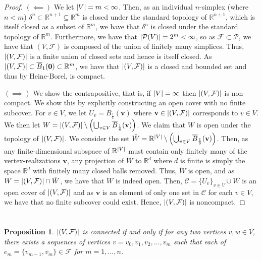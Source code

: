 \documentclass[english]{article}
\renewcommand\vec{\mathbf}
\DeclarePairedDelimiter\abs{\lvert}{\rvert}%
\newcommand{\RR}{\mathbb{R}}
\newcommand{\prob}[1]{\setcounter{section}{#1-1}\section{}}
\newtheorem*{proposition*}{Proposition}
\theoremstyle{remark}
\theoremstyle{definition}
\newcommand{\PP}{\mathcal{P}}
\newcommand{\Fcal}{\mathcal{F}}
\newcommand{\cbal}{\overline{B}}
\newcommand{\Ccal}{\mathcal{C}}
\begin{document}
\begin{proof}
	$(\impliedby)$ We let $\abs{V}=m<\infty$. Then, as an individual $n$-simplex (where $n<m$) $\delta^n\subset \RR^{n+1}\subseteq \RR^m$ is closed under the standard topology of $\RR^{n+1}$, which is itself closed as a subset of $\RR^{m}$, we have that $\delta^n$ is closed under the standard topology of $\RR^{m}$. 
	Furthermore, we have that $\abs{\PP(V)}=2^{m}<\infty$, so as $\Fcal\subset \PP$, we have that $(V,\Fcal)$ is composed of the union of finitely many simplices. 
	Thus, $\abs{(V,\Fcal)}$ is a finite union of closed sets and hence is itself closed. 
	As $\abs{(V,\Fcal)}\subset \overline{B}_{1}(\vec{0})\subset \RR^m$, we have that $\abs{(V,\Fcal)}$ is a closed and bounded set and thus by Heine-Borel, is compact.
	
	$(\implies)$ We show the contrapositive, that is, if $\abs{V}=\infty$ then $\abs{(V,\Fcal)}$ is non-compact.
	 We show this by explicitly constructing an open cover with no finite subcover. For $v\in V$, we let $U_v=B_{\frac{1}{4}}(\vec{v})$ where $\vec{v}\in \abs{(V,\Fcal)}$ corresponds to $v\in V$. We then let $W=\abs{(V,\Fcal)}\setminus \left(\bigcup_{v\in V}\cbal_\frac{1}{8}(\vec v)\right)$.
	  We claim that $W$ is open under the topology of $\abs{(V,\Fcal)}$.
	   We consider the set $\tilde{W}=\RR^{\abs{V}}\setminus \left(\bigcup_{v\in V}\cbal_{\frac{1}{8}}(\vec{v})\right)$.
	    Then, as any finite-dimensional subspace of $\RR^{\abs{V}}$ must contain only finitely many of the vertex-realizations $\vec{v}$, any projection of $\tilde{W}$ to $\RR^d$ where $d$ is finite is simply the space $\RR^d$ with finitely many closed balls removed. 
	    Thus, $\tilde W$ is open, and as $W=\abs{(V,\Fcal)}\cap \tilde W$, we have that $W$ is indeed open.
	    Then, $\Ccal=\{U_v\}_{v\in V}\cup W$ is an open cover of $\abs{(V,\Fcal)}$ and as $\vec{v}$ is an element of only one set in $\Ccal$ for each $v\in V$, we have that no finite subcover could exist.
	     Hence, $\abs{(V,\Fcal)}$ is noncompact.
\end{proof}
	\prob{2}
	\begin{proposition*}
	$\abs{(V,\Fcal)}$ is connected if and only if for any two vertices $v,w\in V$, there exists a sequences of vertices $v=v_0,v_1,v_2,\hdots,v_m$ such that each of $e_m=\{v_{m-1},v_m\}\in \Fcal$ for $m=1,\hdots,n$. 
	\end{proposition*}
\end{document}
